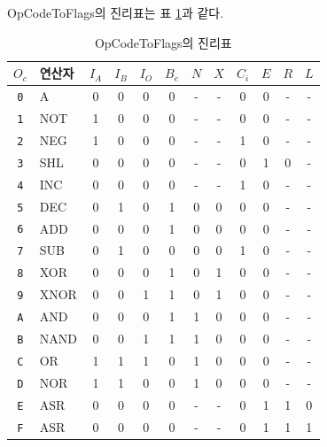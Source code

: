 \documentclass{article}
\renewcommand{\tablename}{표}
\begin{document}
OpCodeToFlags의 진리표는 \tablename{} \ref{tab:octf}과 같다.

\begin{table}
    \centering
    \begin{tabular}{cl||ccccccc|ccc}
        $O_c$ & 연산자 & $I_A$ & $I_B$ & $I_O$ & $B_e$ & $N$ & $X$ & $C_i$ & $E$ & $R$ & $L$ \\
        \hline
        \texttt{0} & A    & 0 & 0 & 0 & 0 & - & - & 0 & 0 & - & - \\
        \texttt{1} & NOT  & 1 & 0 & 0 & 0 & - & - & 0 & 0 & - & - \\
        \texttt{2} & NEG  & 1 & 0 & 0 & 0 & - & - & 1 & 0 & - & - \\
        \texttt{3} & SHL  & 0 & 0 & 0 & 0 & - & - & 0 & 1 & 0 & - \\
        \texttt{4} & INC  & 0 & 0 & 0 & 0 & - & - & 1 & 0 & - & - \\
        \texttt{5} & DEC  & 0 & 1 & 0 & 1 & 0 & 0 & 0 & 0 & - & - \\
        \texttt{6} & ADD  & 0 & 0 & 0 & 1 & 0 & 0 & 0 & 0 & - & - \\
        \texttt{7} & SUB  & 0 & 1 & 0 & 0 & 0 & 0 & 1 & 0 & - & - \\
        \texttt{8} & XOR  & 0 & 0 & 0 & 1 & 0 & 1 & 0 & 0 & - & - \\
        \texttt{9} & XNOR & 0 & 0 & 1 & 1 & 0 & 1 & 0 & 0 & - & - \\
        \texttt{A} & AND  & 0 & 0 & 0 & 1 & 1 & 0 & 0 & 0 & - & - \\
        \texttt{B} & NAND & 0 & 0 & 1 & 1 & 1 & 0 & 0 & 0 & - & - \\
        \texttt{C} & OR   & 1 & 1 & 1 & 0 & 1 & 0 & 0 & 0 & - & - \\
        \texttt{D} & NOR  & 1 & 1 & 0 & 0 & 1 & 0 & 0 & 0 & - & - \\
        \texttt{E} & ASR  & 0 & 0 & 0 & 0 & - & - & 0 & 1 & 1 & 0 \\
        \texttt{F} & ASR  & 0 & 0 & 0 & 0 & - & - & 0 & 1 & 1 & 1 \\
    \end{tabular}
    \caption{OpCodeToFlags의 진리표}
    \label{tab:octf}
\end{table}
\end{document}
